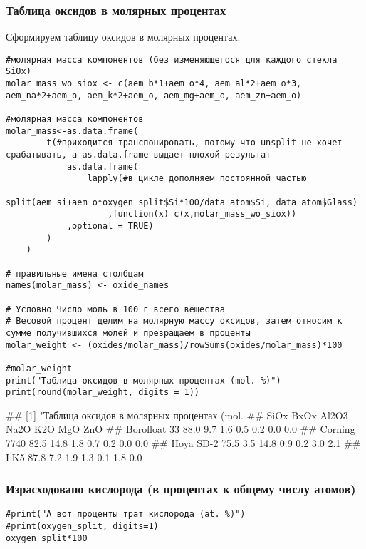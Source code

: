 \subsubsection{Таблица оксидов в молярных процентах}

Сформируем таблицу оксидов в молярных процентах.

\begin{lstlisting}[language=Renhanced]
#молярная масса компонентов (без изменяющегося для каждого стекла SiOx)
molar_mass_wo_siox <- c(aem_b*1+aem_o*4, aem_al*2+aem_o*3, aem_na*2+aem_o, aem_k*2+aem_o, aem_mg+aem_o, aem_zn+aem_o)

#молярная масса компонентов
molar_mass<-as.data.frame(
        t(#приходится транспонировать, потому что unsplit не хочет срабатывать, а as.data.frame выдает плохой результат
            as.data.frame(
                lapply(#в цикле дополняем постоянной частью
                        split(aem_si+aem_o*oxygen_split$Si*100/data_atom$Si, data_atom$Glass)
                    ,function(x) c(x,molar_mass_wo_siox))
            ,optional = TRUE)
        )
    )

# правильные имена столбцам
names(molar_mass) <- oxide_names

# Условно Число моль в 100 г всего вещества
# Весовой процент делим на молярную массу оксидов, затем относим к сумме получившихся молей и превращаем в проценты
molar_weight <- (oxides/molar_mass)/rowSums(oxides/molar_mass)*100

#molar_weight
print("Таблица оксидов в молярных процентах (mol. %)")
print(round(molar_weight, digits = 1))
\end{lstlisting}

\begin{Verb}
## [1] "Таблица оксидов в молярных процентах (mol. %
##              SiOx BxOx Al2O3 Na2O K2O MgO ZnO
## Borofloat 33 88.0  9.7   1.6  0.5 0.2 0.0 0.0
## Corning 7740 82.5 14.8   1.8  0.7 0.2 0.0 0.0
## Hoya SD-2    75.5  3.5  14.8  0.9 0.2 3.0 2.1
## LK5          87.8  7.2   1.9  1.3 0.1 1.8 0.0
\end{Verb}

\subsubsection{Израсходовано кислорода (в процентах к общему числу
атомов)}

\begin{lstlisting}[language=Renhanced]
#print("А вот проценты трат кислорода (at. %)")
#print(oxygen_split, digits=1)
oxygen_split*100
\end{lstlisting}

